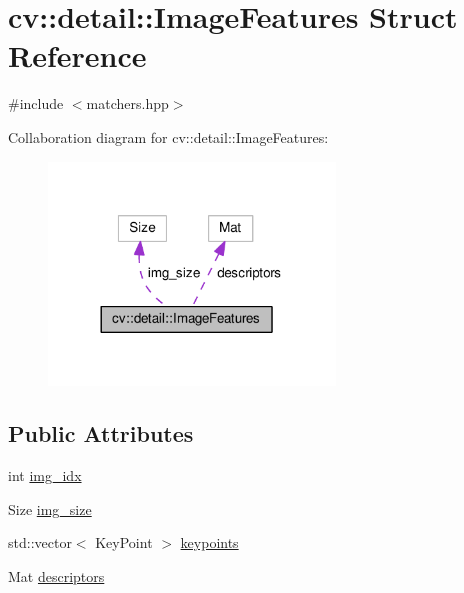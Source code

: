 \hypertarget{structcv_1_1detail_1_1ImageFeatures}{\section{cv\-:\-:detail\-:\-:Image\-Features Struct Reference}
\label{structcv_1_1detail_1_1ImageFeatures}
}


{\ttfamily \#include $<$matchers.\-hpp$>$}



Collaboration diagram for cv\-:\-:detail\-:\-:Image\-Features\-:\nopagebreak
\begin{figure}[H]
\begin{center}
\leavevmode
\includegraphics[width=216pt]{structcv_1_1detail_1_1ImageFeatures__coll__graph}
\end{center}
\end{figure}
\subsection*{Public Attributes}
\begin{DoxyCompactItemize}
\item 
int \hyperlink{structcv_1_1detail_1_1ImageFeatures_a323db3650a49ac613aa22e5847d11402}{img\-\_\-idx}
\item 
Size \hyperlink{structcv_1_1detail_1_1ImageFeatures_a7a1bb046a17262f873efd09fa990b327}{img\-\_\-size}
\item 
std\-::vector$<$ Key\-Point $>$ \hyperlink{structcv_1_1detail_1_1ImageFeatures_a1defd2a583122cb6360ab12c6333212b}{keypoints}
\item 
Mat \hyperlink{structcv_1_1detail_1_1ImageFeatures_ac89a7b84cf2cb861ead1e7634457ba98}{descriptors}
\end{DoxyCompactItemize}


